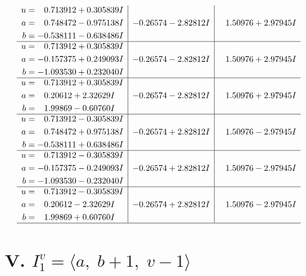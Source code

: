 \documentclass[1p]{elsarticle_modified}
\theoremstyle{definition}
\begin{document}
$$\begin{array}{c|c|c}
\begin{aligned}
u &= \phantom{-}0.713912 + 0.305839 I \\
a &= \phantom{-}0.748472 - 0.975138 I \\
b &= -0.538111 - 0.638486 I\end{aligned}
 & -0.26574 - 2.82812 I & \phantom{-}1.50976 + 2.97945 I \\ \hline\begin{aligned}
u &= \phantom{-}0.713912 + 0.305839 I \\
a &= -0.157375 + 0.249093 I \\
b &= -1.093530 + 0.232040 I\end{aligned}
 & -0.26574 - 2.82812 I & \phantom{-}1.50976 + 2.97945 I \\ \hline\begin{aligned}
u &= \phantom{-}0.713912 + 0.305839 I \\
a &= \phantom{-}0.20612 + 2.32629 I \\
b &= \phantom{-}1.99869 - 0.60760 I\end{aligned}
 & -0.26574 - 2.82812 I & \phantom{-}1.50976 + 2.97945 I \\ \hline\begin{aligned}
u &= \phantom{-}0.713912 - 0.305839 I \\
a &= \phantom{-}0.748472 + 0.975138 I \\
b &= -0.538111 + 0.638486 I\end{aligned}
 & -0.26574 + 2.82812 I & \phantom{-}1.50976 - 2.97945 I \\ \hline\begin{aligned}
u &= \phantom{-}0.713912 - 0.305839 I \\
a &= -0.157375 - 0.249093 I \\
b &= -1.093530 - 0.232040 I\end{aligned}
 & -0.26574 + 2.82812 I & \phantom{-}1.50976 - 2.97945 I \\ \hline\begin{aligned}
u &= \phantom{-}0.713912 - 0.305839 I \\
a &= \phantom{-}0.20612 - 2.32629 I \\
b &= \phantom{-}1.99869 + 0.60760 I\end{aligned}
 & -0.26574 + 2.82812 I & \phantom{-}1.50976 - 2.97945 I\\
 \hline 
 \end{array}$$\newpage\newpage\renewcommand{\arraystretch}{1}
\centering \section*{V. $I^v_{1}= \langle a,\;b+1,\;v-1 \rangle$}
\end{document}
